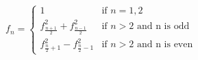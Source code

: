 \documentclass[12pt]{article}
\begin{document}
$
f_n = \left\{ \begin{array}{ll}
	1
		& \mbox{if $n = 1, 2$} \\
	f_{\frac{n+1}{2}}^2 + f_{\frac{n-1}{2}}^2
		& \mbox{if $n>2$ and n is odd}\\
	f_{{\frac{n}{2}}+1}^2 - f_{{\frac{n}{2}}-1}^2
		& \mbox{if $n>2$ and n is even}
	\end{array} \right.
$
\end{document}
